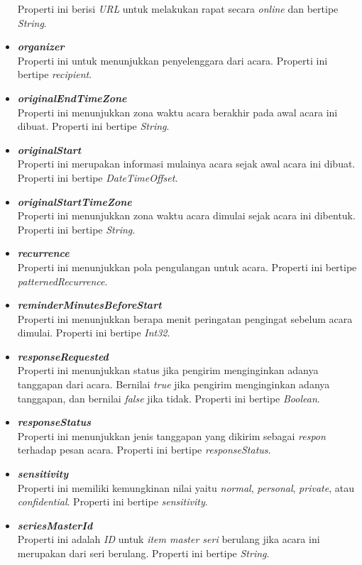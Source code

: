 \begin{itemize}
	Properti ini berisi \textit{URL} untuk melakukan rapat secara \textit{online} dan bertipe \textit{String}. 
	\item \textbf{\textit{organizer}}\\
	Properti ini untuk menunjukkan penyelenggara dari acara. Properti ini bertipe \textit{recipient}. 
	\item \textbf{\textit{originalEndTimeZone}}\\
	Properti ini menunjukkan zona waktu acara berakhir pada awal acara ini dibuat. Properti ini bertipe \textit{String}. 
	\item \textbf{\textit{originalStart}}\\
	Properti ini merupakan informasi mulainya acara sejak awal acara ini dibuat. Properti ini bertipe \textit{DateTimeOffset}.  
	\item \textbf{\textit{originalStartTimeZone}}\\
	Properti ini menunjukkan zona waktu acara dimulai sejak acara ini dibentuk. Properti ini bertipe \textit{String}. 
	\item \textbf{\textit{recurrence}}\\
	Properti ini menunjukkan pola pengulangan untuk acara. Properti ini bertipe \textit{patternedRecurrence}. 
	\item \textbf{\textit{reminderMinutesBeforeStart}}\\
	Properti ini menunjukkan berapa menit peringatan pengingat sebelum acara dimulai. Properti ini bertipe \textit{Int32}. 
	\item \textbf{\textit{responseRequested}}\\
	Properti ini menunjukkan status jika pengirim menginginkan adanya tanggapan dari acara. Bernilai \textit{true} jika pengirim menginginkan adanya tanggapan, dan bernilai \textit{false} jika tidak. Properti ini bertipe \textit{Boolean}. 
	\item \textbf{\textit{responseStatus}}\\
	Properti ini menunjukkan jenis tanggapan yang dikirim sebagai \textit{respon} terhadap pesan acara. Properti ini bertipe \textit{responseStatus}. 
	\item \textbf{\textit{sensitivity}}\\
	Properti ini memiliki kemungkinan nilai yaitu \textit{normal}, \textit{personal}, \textit{private}, atau \textit{confidential}. Properti ini bertipe \textit{sensitivity}. 
	\item \textbf{\textit{seriesMasterId}}\\
	Properti ini adalah \textit{ID} untuk \textit{item master seri} berulang jika acara ini merupakan dari seri berulang. Properti ini bertipe \textit{String}.  

\end{itemize}
